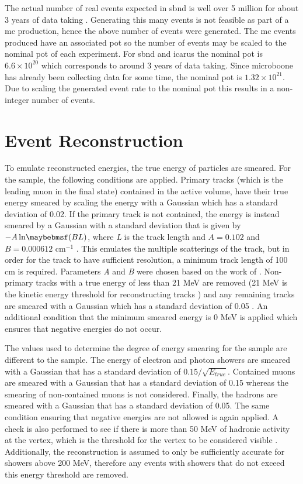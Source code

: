 The actual number of real \numu events expected in \gls{sbnd} is well over 5 million for about 3 years of data taking \cite{sbnd_pot}. Generating this many events is not feasible as part of a \gls{mc} production, hence the above number of events were generated. The \gls{mc} events produced have an associated \gls{pot} so the number of events may be scaled to the nominal \gls{pot} of each experiment. For \gls{sbnd} and \gls{icarus} the nominal \gls{pot} is $6.6 \times 10^{20}$ which corresponds to around 3 years of data taking.  Since \gls{microboone} has already been collecting data for some time, the nominal \gls{pot} is $1.32 \times 10^{21}$. Due to scaling the generated event rate to the nominal \gls{pot} this results in a non-integer number of events. %

\section{Event Reconstruction}

To emulate reconstructed energies, the true energy of particles are smeared. For the \numu sample, the following conditions are applied. Primary tracks (which is the leading muon in the final state) contained in the active volume, have their true energy smeared by scaling the energy with a Gaussian which has a standard deviation of 0.02. If the primary track is not contained, the energy is instead smeared by a Gaussian with a standard deviation that is given by $-A\lnOfbraces{BL}$,
where \textit{L} is the track length and $A = 0.102$ and $B = 0.000612$ cm$^{-1}$ \cite{SBN_Proposal}. This emulates the multiple scatterings of the track, but in order for the track to have sufficient resolution, a minimum track length of 100 cm is required. Parameters \textit{A} and \textit{B} were chosen based on the work of \cite{ICARUS_muon_smearing}. Non-primary tracks with a true energy of less than 21 MeV are removed (21 MeV is the kinetic energy threshold for reconstructing tracks \cite{SBN_Proposal}) and any remaining tracks are smeared with a Gaussian which has a standard deviation of 0.05 \cite{SBN_Proposal}. An additional condition that the minimum smeared energy is 0 MeV is applied which ensures that negative energies do not occur.

The values used to determine the degree of energy smearing for the \nue sample are different to the \numu sample. The energy of electron and photon showers are smeared with a Gaussian that has a standard deviation of $0.15/\sqrt{E_{true}}$. Contained muons are smeared with a Gaussian that has a standard deviation of 0.15 whereas the smearing of non-contained muons is not considered. Finally, the hadrons are smeared with a Gaussian that has a standard deviation of 0.05. The same condition ensuring that negative energies are not allowed is again applied. A check is also performed to see if there is more than 50 MeV of hadronic activity at the vertex, which is the threshold for the vertex to be considered visible \cite{SBN_Proposal}. Additionally, the reconstruction is assumed to only be sufficiently accurate for showers above 200 MeV, therefore any events with showers that do not exceed this energy threshold are removed. 

